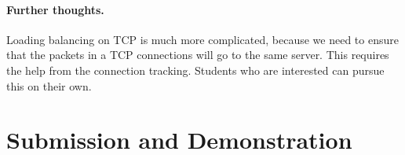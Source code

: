 \paragraph{Further thoughts.}
Loading balancing on TCP is much more complicated, 
because we need to ensure that the packets in a TCP connections 
will go to the same server. This requires the help from 
the connection tracking. Students who are interested can
pursue this on their own. 



\section{Submission and Demonstration}










